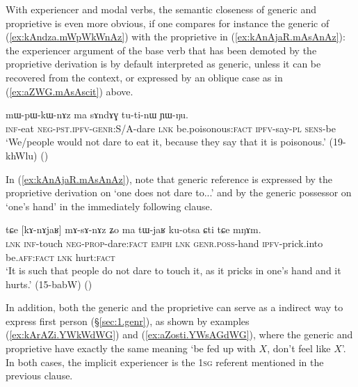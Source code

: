 With experiencer and modal verbs, the semantic closeness of generic and proprietive is even more obvious, if one compares for instance the generic of  (\ref{ex:kAndza.mWpWkWnAz}) with the proprietive    in (\ref{ex:kAnAjaR.mAsAnAz}): the experiencer argument of the base verb that has been demoted by the proprietive derivation is by default interpreted as generic, unless it can be recovered from the context, or expressed by an oblique case as in (\ref{ex:aZWG.mAsAscit}) above.

\begin{exe}
\ex \label{ex:kAndza.mWpWkWnAz}
\gll [kɤ-ndza] mɯ-pɯ-kɯ-nɤz ma sɤndɤɣ tu-ti-nɯ ɲɯ-ŋu. \\
\textsc{inf}-eat \textsc{neg}-\textsc{pst}.\textsc{ipfv}-\textsc{genr}:S/A-dare \textsc{lnk} be.poisonous:\textsc{fact} \textsc{ipfv}-say-\textsc{pl} \textsc{sens}-be \\
\glt `We/people would not dare to eat it, because they say that it is poisonous.' (19-khWlu)
()
\end{exe}

In (\ref{ex:kAnAjaR.mAsAnAz}), note that generic reference is expressed by the proprietive derivation on  `one does not dare to...' and by the generic possessor on  `one's hand' in the immediately following clause.

\begin{exe}
\ex \label{ex:kAnAjaR.mAsAnAz}
\gll tɕe [kɤ-nɤjaʁ] mɤ-sɤ-nɤz ʑo ma tɯ-jaʁ ku-otsa ɕti tɕe mŋɤm. \\
\textsc{lnk} \textsc{inf}-touch \textsc{neg}-\textsc{prop}-dare:\textsc{fact} \textsc{emph} \textsc{lnk} \textsc{genr}.\textsc{poss}-hand \textsc{ipfv}-prick.into be.\textsc{aff}:\textsc{fact} \textsc{lnk} hurt:\textsc{fact} \\
\glt `It is such that people do not dare to touch it, as it pricks in one's hand and it hurts.' (15-babW)
()
\end{exe}

 In addition, both the generic and the proprietive can serve as a indirect way to express first person (§\ref{sec:1.genr}), as shown by examples (\ref{ex:kArAZi.YWkWdWG}) and (\ref{ex:aZosti.YWsAGdWG}), where the generic  and proprietive  have exactly the same meaning `be fed up with $X$, don't feel like $X$'. In both cases, the implicit experiencer is the \textsc{1sg} referent mentioned in the previous clause.

